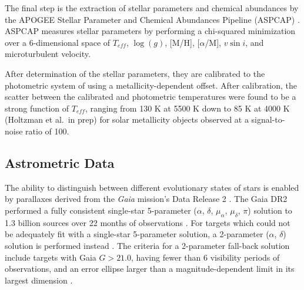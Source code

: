 \documentclass[manuscript]{aastex6}
\newcommand{\vsini}{\ensuremath{v \sin i}}
\newcommand{\Gaia}{\mbox{\textit{Gaia}}}
\newcommand{\Teff}{\ensuremath{T_{eff}}}
\newcommand{\logg}{\ensuremath{\log(g)}}
\begin{document}
The final step is the extraction of stellar parameters and chemical abundances
by the APOGEE Stellar Parameter and Chemical Abundances Pipeline (ASPCAP)
\citep{GarciaPerez16}. ASPCAP measures stellar parameters by performing a
chi-squared minimization \citep{AllendePrieto06} over a 6-dimensional space of
\Teff, \logg, [M/H], [\(\alpha\)/M], \vsini, and microturbulent velocity.

After determination of the stellar parameters, they are calibrated to the
photometric system of \citet{GonzalezHernandez09} using a metallicity-dependent
offset. After calibration, the scatter between the calibrated and photometric
temperatures  were found to be a strong function of \Teff{}, ranging from 130 
K at 5500 K down to 85 K at 4000 K (Holtzman et al.\ in prep) for solar
metallicity objects observed at a signal-to-noise ratio of 100. 



\subsection{Astrometric Data}

The ability to distinguish between different evolutionary states of stars is
enabled by parallaxes derived from the \Gaia{} mission's Data Release 2
\citep{Gaia18}. The Gaia DR2 performed a fully consistent single-star
5-parameter (\(\alpha\), \(\delta\), \(\mu_\alpha\), \(\mu_\delta\), \(\pi\))
solution to 1.3 billion sources over 22 months of observations
\citep{Lindegren18}. For targets which could not be adequately fit with a
single-star 5-parameter solution, a 2-parameter (\(\alpha\), \(\delta\))
solution is performed instead \citep{Michalik15}. The criteria for a
2-parameter fall-back solution include targets with Gaia \(G > 21.0\), having
fewer than 6 visibility periods of observations, and an error ellipse larger
than a magnitude-dependent limit in its largest dimension \citep{Lindegren18}.

\end{document}
